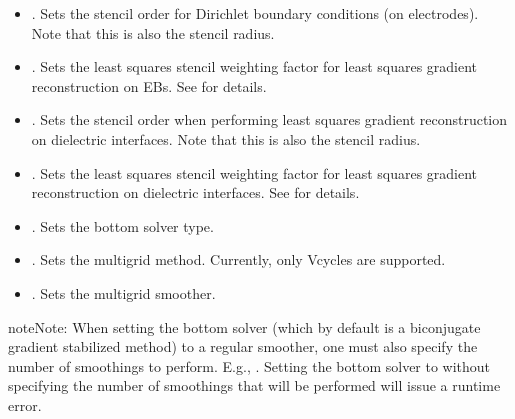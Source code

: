 \documentclass[letterpaper,10pt,english]{sphinxmanual}
\begin{document}
\begin{itemize}
\item {} 
\sphinxAtStartPar
{}.
Sets the stencil order for Dirichlet boundary conditions (on electrodes).
Note that this is also the stencil radius.

\item {} 
\sphinxAtStartPar
{}. Sets the least squares stencil weighting factor for least squares gradient reconstruction on EBs.
See {\hyperref[\detokenize{Utilities/LeastSquares:chap-leastsquares}]{}} for details.

\item {} 
\sphinxAtStartPar
{}. Sets the stencil order when performing least squares gradient reconstruction on dielectric interfaces.
Note that this is also the stencil radius.

\item {} 
\sphinxAtStartPar
{}.
Sets the least squares stencil weighting factor for least squares gradient reconstruction on dielectric interfaces.
See {\hyperref[\detokenize{Utilities/LeastSquares:chap-leastsquares}]{}} for details.

\item {} 
\sphinxAtStartPar
{}.
Sets the bottom solver type.

\item {} 
\sphinxAtStartPar
{}.
Sets the multigrid method.
Currently, only V\sphinxhyphen{}cycles are supported.

\item {} 
\sphinxAtStartPar
{}.
Sets the multigrid smoother.

\end{itemize}

\begin{sphinxadmonition}{note}{Note:}
\sphinxAtStartPar
When setting the bottom solver (which by default is a biconjugate gradient stabilized method) to a regular smoother, one must also specify the number of smoothings to perform.
E.g., .
Setting the bottom solver to  without specifying the number of smoothings that will be performed will issue a run\sphinxhyphen{}time error.
\end{sphinxadmonition}
\end{document}
